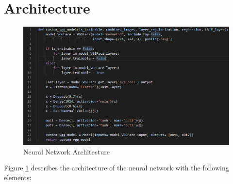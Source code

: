 
\section{Architecture}

\begin{figure}[H]
  \begin{center}
  \includegraphics[angle=0, width=1.0\textwidth]{Figures/model_architecture.PNG}
  \caption{Neural Network Architecture}
  \label{fig:NNArchitecture}
  \end{center}
\end{figure}

Figure \ref{fig:NNArchitecture} describes the architecture of the neural network with the following elements:

